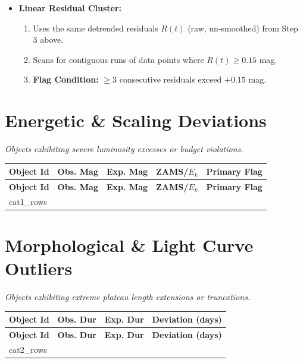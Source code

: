 \documentclass[11pt,a4paper]{article}
\begin{document}
\begin{itemize}
    \item \textbf{Linear Residual Cluster:}
    \begin{enumerate}
        \item Uses the same detrended residuals $R(t)$ (raw, un-smoothed) from Step 3 above.
        \item Scans for contiguous runs of data points where $R(t) \ge 0.15$ mag.
        \item \textbf{Flag Condition:} $\ge 3$ consecutive residuals exceed $+0.15$ mag.
    \end{enumerate}
\end{itemize}
\clearpage

\section{Energetic \& Scaling Deviations} \label{sec:catI}
\textit{Objects exhibiting severe luminosity excesses or budget violations.}
\begin{longtable}{@{}llccl@{}}
\toprule
\textbf{Object Id} & \textbf{Obs. Mag} & \textbf{Exp. Mag} & \textbf{ZAMS/$E_k$} & \textbf{Primary Flag} \\ \midrule
\endfirsthead
\toprule
\textbf{Object Id} & \textbf{Obs. Mag} & \textbf{Exp. Mag} & \textbf{ZAMS/$E_k$} & \textbf{Primary Flag} \\ \midrule
\endhead
\bottomrule
\endfoot
{cat1_rows}\end{longtable}

\clearpage
\section{Morphological \& Light Curve Outliers} \label{sec:catII}
\textit{Objects exhibiting extreme plateau length extensions or truncations.}
\begin{longtable}{@{}lccc@{}}
\toprule
\textbf{Object Id} & \textbf{Obs. Dur} & \textbf{Exp. Dur} & \textbf{Deviation (days)} \\ \midrule
\endfirsthead
\toprule
\textbf{Object Id} & \textbf{Obs. Dur} & \textbf{Exp. Dur} & \textbf{Deviation (days)} \\ \midrule
\endhead
\bottomrule
\endfoot
{cat2_rows}\end{longtable}

\clearpage
\end{document}
